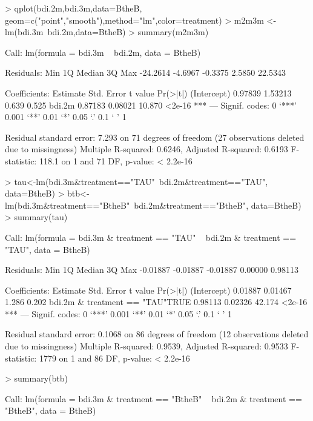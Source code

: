 \documentclass{article}
\begin{document}
\begin{Schunk}
\begin{Sinput}
> qplot(bdi.2m,bdi.3m,data=BtheB, geom=c("point","smooth"),method="lm",color=treatment)
> m2m3m <- lm(bdi.3m~bdi.2m,data=BtheB)
> summary(m2m3m)
\end{Sinput}
\begin{Soutput}
Call:
lm(formula = bdi.3m ~ bdi.2m, data = BtheB)

Residuals:
     Min       1Q   Median       3Q      Max 
-24.2614  -4.6967  -0.3375   2.5850  22.5343 

Coefficients:
            Estimate Std. Error t value Pr(>|t|)    
(Intercept)  0.97839    1.53213   0.639    0.525    
bdi.2m       0.87183    0.08021  10.870   <2e-16 ***
---
Signif. codes:  0 ‘***’ 0.001 ‘**’ 0.01 ‘*’ 0.05 ‘.’ 0.1 ‘ ’ 1

Residual standard error: 7.293 on 71 degrees of freedom
  (27 observations deleted due to missingness)
Multiple R-squared:  0.6246,	Adjusted R-squared:  0.6193 
F-statistic: 118.1 on 1 and 71 DF,  p-value: < 2.2e-16
\end{Soutput}
\begin{Sinput}
> tau<-lm(bdi.3m&treatment=="TAU"~bdi.2m&treatment=="TAU", data=BtheB)
> btb<-lm(bdi.3m&treatment=="BtheB"~bdi.2m&treatment=="BtheB", data=BtheB)
> summary(tau)
\end{Sinput}
\begin{Soutput}
Call:
lm(formula = bdi.3m & treatment == "TAU" ~ bdi.2m & treatment == 
    "TAU", data = BtheB)

Residuals:
     Min       1Q   Median       3Q      Max 
-0.01887 -0.01887 -0.01887  0.00000  0.98113 

Coefficients:
                                Estimate Std. Error t value Pr(>|t|)    
(Intercept)                      0.01887    0.01467   1.286    0.202    
bdi.2m & treatment == "TAU"TRUE  0.98113    0.02326  42.174   <2e-16 ***
---
Signif. codes:  0 ‘***’ 0.001 ‘**’ 0.01 ‘*’ 0.05 ‘.’ 0.1 ‘ ’ 1

Residual standard error: 0.1068 on 86 degrees of freedom
  (12 observations deleted due to missingness)
Multiple R-squared:  0.9539,	Adjusted R-squared:  0.9533 
F-statistic:  1779 on 1 and 86 DF,  p-value: < 2.2e-16
\end{Soutput}
\begin{Sinput}
> summary(btb)
\end{Sinput}
\begin{Soutput}
Call:
lm(formula = bdi.3m & treatment == "BtheB" ~ bdi.2m & treatment == 
    "BtheB", data = BtheB)


\end{Soutput}
\end{Schunk}
\end{document}
